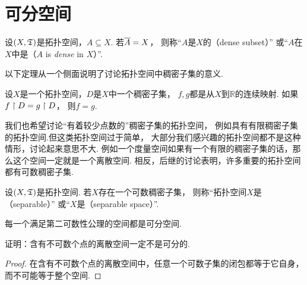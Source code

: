 \section{可分空间}
\begin{definition}
设\((X,{\mathfrak T})\)是拓扑空间，\(A \subseteq X\).
若\(\overline{A}=X\)，
则称“\(A\)是\(X\)的（dense subset）”
或“\(A\)在\(X\)中是（\(A\) is \emph{dense} in \(X\)）”.
\end{definition}

以下定理从一个侧面说明了讨论拓扑空间中稠密子集的意义.
\begin{theorem}
设\(X\)是一个拓扑空间，\(D\)是\(X\)中一个稠密子集，
\(f,g\)都是从\(X\)到\(\mathbb{R}\)的连续映射.
如果\(f \upharpoonright D = g \upharpoonright D\)，
则\(f = g\).
\end{theorem}

我们也希望讨论“有着较少点数的”稠密子集的拓扑空间，
例如具有有限稠密子集的拓扑空间.但这类拓扑空间过于简单，
大部分我们感兴趣的拓扑空间都不是这种情形，讨论起来意思不大.
例如一个度量空间如果有一个有限的稠密子集的话，那么这个空间一定就是一个离散空间.
相反，后继的讨论表明，许多重要的拓扑空间都有可数稠密子集.

\begin{definition}
设\((X,{\mathfrak T})\)是拓扑空间.
若\(X\)存在一个可数稠密子集，
则称“拓扑空间\(X\)是（separable）”
或“\(X\)是（separable space）”.
\end{definition}

\begin{theorem}\label{theorem:可分空间.满足第二可数性公理的空间都是可分空间}
每一个满足第二可数性公理的空间都是可分空间.
\end{theorem}

\begin{example}
证明：含有不可数个点的离散空间一定不是可分的.
\begin{proof}
在含有不可数个点的离散空间中，任意一个可数子集的闭包都等于它自身，而不可能等于整个空间.
\end{proof}
\end{example}

